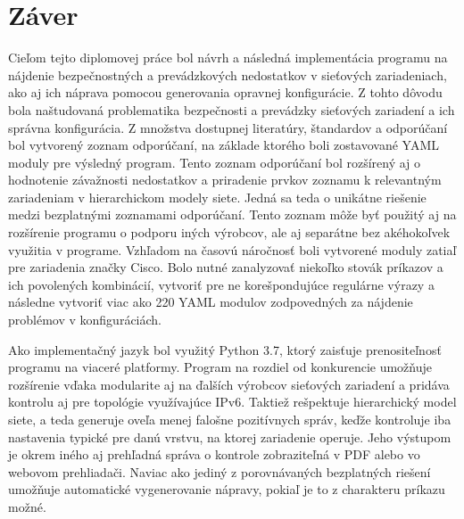 \chapter*{Záver}
{}








Cieľom tejto diplomovej práce bol návrh a následná implementácia programu na nájdenie bezpečnostných a prevádzkových nedostatkov v sieťových zariadeniach, ako aj ich náprava pomocou generovania opravnej konfigurácie. Z tohto dôvodu bola naštudovaná problematika bezpečnosti a prevádzky sieťových zariadení a ich správna konfigurácia. Z množstva dostupnej literatúry, štandardov a odporúčaní bol vytvorený zoznam odporúčaní, na základe ktorého boli zostavované YAML moduly pre výsledný program. Tento zoznam odporúčaní bol rozšírený aj o hodnotenie závažnosti nedostatkov a priradenie prvkov zoznamu k relevantným zariadeniam v hierarchickom modely siete. Jedná sa teda o unikátne riešenie medzi bezplatnými zoznamami odporúčaní. Tento zoznam môže byť použitý aj na rozšírenie programu o podporu iných výrobcov, ale aj separátne bez akéhokoľvek využitia v programe. Vzhľadom na časovú náročnosť boli vytvorené moduly zatiaľ pre zariadenia značky Cisco. Bolo nutné zanalyzovať niekoľko stovák príkazov a ich povolených kombinácií, vytvoriť pre ne korešpondujúce regulárne výrazy a následne vytvoriť viac ako 220 YAML modulov zodpovedných za nájdenie problémov v konfiguráciách. 

Ako implementačný jazyk bol využitý Python 3.7, ktorý zaisťuje prenositeľnosť programu na viaceré platformy. Program na rozdiel od konkurencie umožňuje rozšírenie vďaka modularite aj na ďalších výrobcov sieťových zariadení a pridáva kontrolu aj pre topológie využívajúce IPv6. Taktiež rešpektuje hierarchický model siete, a teda generuje oveľa menej falošne pozitívnych správ, keďže kontroluje iba nastavenia typické pre danú vrstvu, na ktorej zariadenie operuje. Jeho výstupom je okrem iného aj prehľadná správa o kontrole zobraziteľná v PDF alebo vo webovom prehliadači. Naviac ako jediný z porovnávaných bezplatných riešení umožňuje automatické vygenerovanie nápravy, pokiaľ je to z charakteru príkazu možné. 

